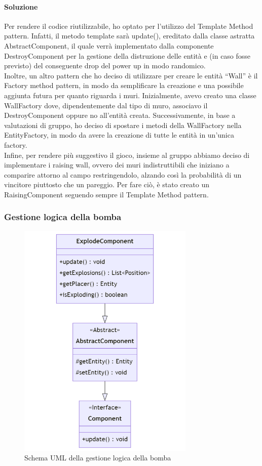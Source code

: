 \documentclass[a4paper,12pt]{report}
\begin{document}
\paragraph{Soluzione} Per rendere il codice riutilizzabile, ho optato per l’utilizzo del Template Method pattern. Infatti, il metodo template sarà update(), ereditato dalla classe astratta AbstractComponent, il quale verrà implementato dalla componente DestroyComponent per la gestione della distruzione delle entità e (in caso fosse previsto) del conseguente drop del power up in modo randomico.
\\
Inoltre, un altro pattern che ho deciso di utilizzare per creare le entità “Wall” è il Factory method pattern, in modo da semplificare la creazione e una possibile aggiunta futura per quanto riguarda i muri. Inizialmente, avevo creato una classe WallFactory dove, dipendentemente dal tipo di muro, associavo il DestroyComponent oppure no all’entità creata. Successivamente, in base a valutazioni di gruppo, ho deciso di spostare i metodi della WallFactory nella EntityFactory, in modo da avere la creazione di tutte le entità in un’unica factory.
\\
Infine, per rendere più suggestivo il gioco, insieme al gruppo abbiamo deciso di implementare i raising wall, ovvero dei muri indistruttibili che iniziano a comparire attorno al campo restringendolo, alzando così la probabilità di un vincitore piuttosto che un pareggio. Per fare ciò, è stato creato un RaisingComponent seguendo sempre il Template Method pattern.


\subsubsection{Gestione logica della bomba}

\begin{figure}[H]
    \centering{}
    \includegraphics[width=0.75\textwidth]{img/UMLGestioneBombe.png}
    \caption{Schema UML della gestione logica della bomba}
    \label{}
\end{figure}
\end{document}
